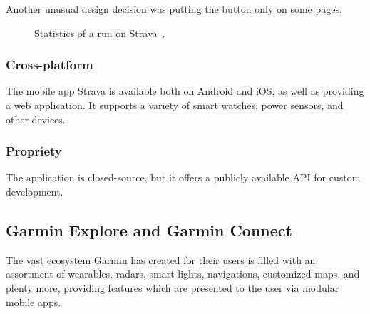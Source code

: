 Another unusual design decision was putting the  button only on some pages.

\begin{figure}[h]
    \centering
    \caption{Statistics of a run on Strava~\cite{strava-run-stats-img}.}
    \label{strava-run-stats-img}
\end{figure}

\subsubsection*{Cross-platform}
The mobile app Strava is available both on Android and iOS, as well as providing a web application.
It supports a variety of smart watches, power sensors, and other devices.
\subsubsection*{Propriety}
The application is closed-source, but it offers a publicly available API for custom development.
\subsection{Garmin Explore and Garmin Connect}
The vast ecosystem Garmin has created for their users is filled with an assortment of wearables, radars, smart lights, navigations, customized maps, and plenty more, providing features which are presented to the user via modular mobile apps.


